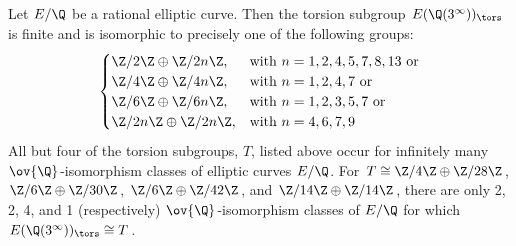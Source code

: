 \begin{frame}[plain]
\end{frame}





\begin{frame}[plain]
\footnotesize
\begin{thm}
Let $E/\Q$ be a rational elliptic curve. Then the torsion subgroup $E(\Q(3^\infty))_\tors$ is finite and is isomorphic to precisely one of the following groups:
	\[
	\begin{cases}
	\Z/2\Z \oplus \Z/2n\Z, & \text{with } n= 1, 2, 4, 5, 7, 8, 13 \text{ or} \\
	\Z/4\Z \oplus \Z/4n\Z, & \text{with } n= 1, 2, 4, 7 \text{ or} \\
	\Z/6\Z \oplus \Z/6n\Z, & \text{with } n= 1, 2, 3, 5, 7 \text{ or} \\
	\Z/2n\Z \oplus \Z/2n\Z, & \text{with } n= 4, 6, 7, 9 \\
	\end{cases}
	\]
All but four of the torsion subgroups, $T$, listed above occur for infinitely many $\ov{\Q}$-isomorphism classes of elliptic curves $E/\Q$. For $T \cong \Z/4\Z \oplus \Z/28\Z$, $\Z/6\Z \oplus \Z/30\Z$, $\Z/6\Z \oplus \Z/42\Z$, and $\Z/14\Z \oplus \Z/14\Z$, there are only 2, 2, 4, and 1 (respectively) $\ov{\Q}$-isomorphism classes of $E/\Q$ for which $E(\Q(3^\infty))_\tors \cong T$. 
\end{thm}
	\begin{figure}[h]
	\centering
	\begin{subfigure}{0.23\textwidth}
	\captionsetup{labelformat=empty}
	\centering

\end{subfigure}
\end{figure}
\end{frame}
